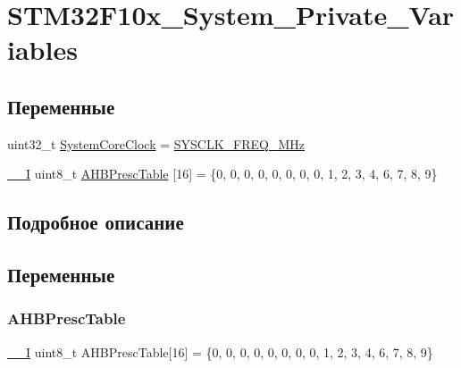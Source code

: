 \hypertarget{group___s_t_m32_f10x___system___private___variables}{}\section{S\+T\+M32\+F10x\+\_\+\+System\+\_\+\+Private\+\_\+\+Variables}
\label{group___s_t_m32_f10x___system___private___variables}
\subsection*{Переменные}
\begin{DoxyCompactItemize}
\item 
uint32\+\_\+t \mbox{\hyperlink{group___s_t_m32_f10x___system___private___variables_gaa3cd3e43291e81e795d642b79b6088e6}{System\+Core\+Clock}} = \mbox{\hyperlink{group___s_t_m32_f10x___system___private___defines_ga69649cc38f34627cfb48b51062ebd390}{S\+Y\+S\+C\+L\+K\+\_\+\+F\+R\+E\+Q\+\_\+M\+Hz}}
\item 
\mbox{\hyperlink{group___c_m_s_i_s___c_m3__core__definitions_gaf63697ed9952cc71e1225efe205f6cd3}{\+\_\+\+\_\+I}} uint8\+\_\+t \mbox{\hyperlink{group___s_t_m32_f10x___system___private___variables_gacdc3ef54c0704c90e69a8a84fb2d970d}{A\+H\+B\+Presc\+Table}} \mbox{[}16\mbox{]} = \{0, 0, 0, 0, 0, 0, 0, 0, 1, 2, 3, 4, 6, 7, 8, 9\}
\end{DoxyCompactItemize}


\subsection{Подробное описание}


\subsection{Переменные}
\mbox{\label{group___s_t_m32_f10x___system___private___variables_gacdc3ef54c0704c90e69a8a84fb2d970d}} 
\subsubsection{\texorpdfstring{AHBPrescTable}{AHBPrescTable}}
{\footnotesize\ttfamily \mbox{\hyperlink{group___c_m_s_i_s___c_m3__core__definitions_gaf63697ed9952cc71e1225efe205f6cd3}{\+\_\+\+\_\+I}} uint8\+\_\+t A\+H\+B\+Presc\+Table\mbox{[}16\mbox{]} = \{0, 0, 0, 0, 0, 0, 0, 0, 1, 2, 3, 4, 6, 7, 8, 9\}}

